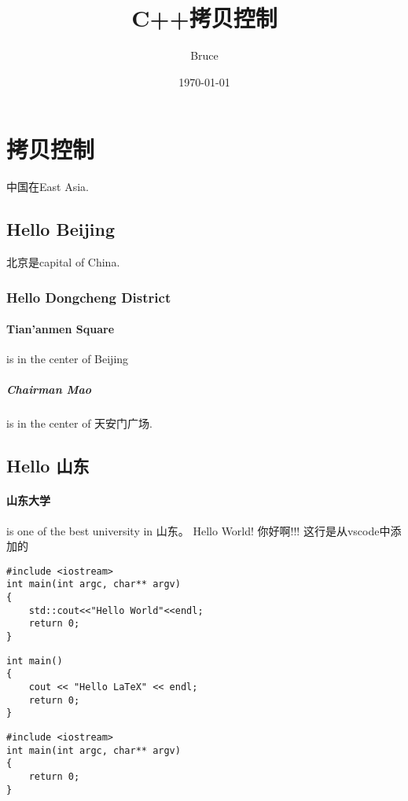 \documentclass{article}
\title{C++拷贝控制}
\author{Bruce}
\date{\today}
\begin{document}
\maketitle
\tableofcontents


\section{拷贝控制}
中国在East Asia.
\subsection{Hello Beijing}
北京是capital of China.
\subsubsection{Hello Dongcheng District}
\paragraph{Tian'anmen Square}
is in the center of Beijing
\subparagraph{Chairman Mao}
is in the center of 天安门广场.
\subsection{Hello 山东}
\paragraph{山东大学} is one of the best university in 山东。\newline
Hello World! 你好啊!!!
这行是从vscode中添加的


\begin{verbatim}
#include <iostream>
int main(int argc, char** argv)
{
    std::cout<<"Hello World"<<endl;
    return 0;    
}
\end{verbatim}

\begin{verbatim}
int main()
{
    cout << "Hello LaTeX" << endl;
    return 0;
}
\end{verbatim}

\begin{lstlisting}[caption= hello world]
#include <iostream>
int main(int argc, char** argv)
{
    return 0;
}
\end{lstlisting}
\end{document}

